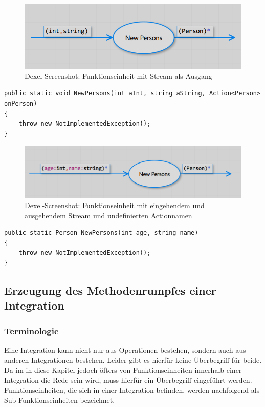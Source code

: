 	\begin{figure}[H]
		\centering
		\includegraphics[width=.9\linewidth]{./img/roslyn_Stream.png} 
		\caption{Dexel-Screenshot: Funktionseinheit mit Stream als Ausgang}
	\end{figure}
	


	
	
\begin{lstlisting}[caption=Mit Dexel generierter Code ]
public static void NewPersons(int aInt, string aString, Action<Person> onPerson)
{
	throw new NotImplementedException();
}
\end{lstlisting}
	
		
	\begin{figure}[H]
		\centering
		\includegraphics[width=.9\linewidth]{./img/roslyn_StreamStream.png} 
		\caption{Dexel-Screenshot: Funktionseinheit mit eingehendem und ausgehendem Stream und undefinierten Actionnamen}
	\end{figure}
			

	\begin{lstlisting}[caption=Mit Dexel generierter Code ]
public static Person NewPersons(int age, string name)
{
	throw new NotImplementedException();
}
	\end{lstlisting}
	 

\subsection{Erzeugung des Methodenrumpfes einer Integration}
\label{sec:orgheadline51}


	 \subsubsection{Terminologie}

	Eine Integration kann nicht nur aus
	Operationen bestehen, sondern auch aus anderen Integrationen bestehen.
	Leider gibt es hierfür keine Überbegriff für beide.
	Da im in diese Kapitel jedoch öfters von Funktionseinheiten innerhalb einer
	Integration die Rede sein wird, muss hierfür ein Überbegriff eingeführt
	werden. Funktionseinheiten, die sich in einer Integration befinden, werden
	nachfolgend als Sub-Funktionseinheiten bezeichnet.
	
